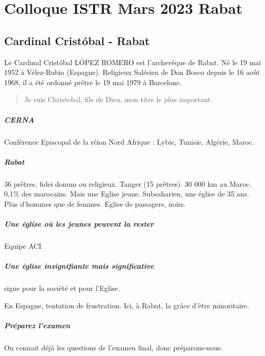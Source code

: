 \chapter{Colloque ISTR Mars 2023 Rabat}

\section{Cardinal Cristóbal - Rabat}

Le Cardinal Cristóbal LÓPEZ ROMERO est l'archevêque de Rabat. Né le 19 mai 1952 à Vélez-Rubio (Espagne). Religieux Salésien de Don Bosco depuis le 16 août 1968, il a été ordonné prêtre le 19 mai 1979 à Barcelone.

\begin{quote}
    Je suis Christobal, fils de Dieu, mon titre le plus important.
\end{quote}

\paragraph{CERNA} Conférence Episcopal de la réion Nord Afrique : Lybie, Tunisie, Algérie, Maroc. 

\paragraph{Rabat} 36 prêtres, fidei donum ou religieux. Tanger (15 prêtres). 30 000 km au Maroc. 0,1\% des marocains.
Mais une Eglise jeune. Subsaharien, une église de 35 ans. Plus d'hommes que de femmes. Eglise de passagers, noirs. 

\paragraph{Une église où les jeunes peuvent la rester}
Equipe ACI

\paragraph{Une église insignifiante mais significative}
signe pour la société et pour l'Eglise.

\begin{Def}
En Espagne, tentation de frustration. Ici, à Rabat, la grâce d'être minoritaire. 
\end{Def}
\paragraph{Préparez l'examen} On connait déjà les questions de l'examen final, donc préparons-nous.

